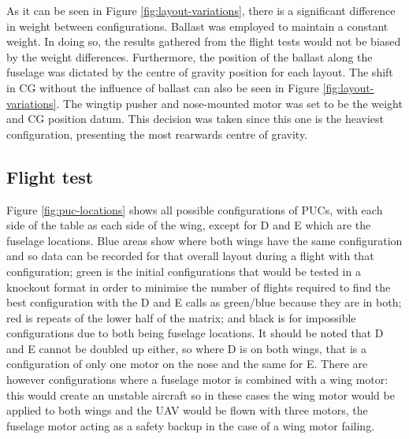 \documentclass[../../main.tex]{subfiles}
\begin{document}
As it can be seen in Figure \ref{fig:layout-variations}, there is a significant difference in weight between configurations.
Ballast was employed to maintain a constant weight.
In doing so, the results gathered from the flight tests would not be biased by the weight differences.
Furthermore, the position of the ballast along the fuselage was dictated by the centre of gravity position for each layout.
The shift in CG without the influence of ballast can also be seen in Figure \ref{fig:layout-variations}.
The wingtip pusher and nose-mounted motor was set to be the weight and CG position datum.
This decision was taken since this one is the heaviest configuration, presenting the most rearwards centre of gravity. 


\subsection{Flight test} \label{sec:project-review:testing-and-evaluation:flight-test}


Figure \ref{fig:puc-locations} shows all possible configurations of PUCs, with each side of the table as each side of the wing, except for D and E which are the fuselage locations.
Blue areas show where both wings have the same configuration and so data can be recorded for that overall layout during a flight with that configuration; green is the initial configurations that would be tested in a knockout format in order to minimise the number of flights required to find the best configuration with the D and E calls as green/blue because they are in both; red is repeats of the lower half of the matrix; and black is for impossible configurations due to both being fuselage locations.
It should be noted that D and E cannot be doubled up either, so where D is on both wings, that is a configuration of only one motor on the nose and the same for E.
There are however configurations where a fuselage motor is combined with a wing motor: this would create an unstable aircraft so in these cases the wing motor would be applied to both wings and the UAV would be flown with three motors, the fuselage motor acting as a safety backup in the case of a wing motor failing.
\end{document}
